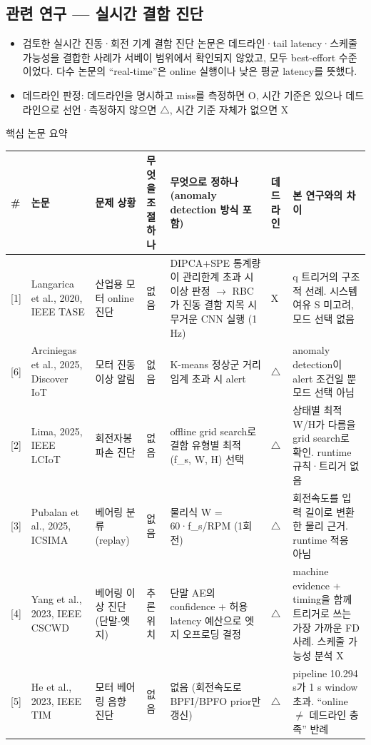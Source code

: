 \documentclass[10pt]{article}
\begin{document}
\subsection{관련 연구 --- 실시간 결함 진단}
\begin{itemize}
\item 검토한 실시간 진동·회전 기계 결함 진단 논문은 데드라인·tail latency·스케줄 가능성을 결합한 사례가 서베이 범위에서 확인되지 않았고, 모두 best-effort 수준이었다. 다수 논문의 ``real-time''은 online 실행이나 낮은 평균 latency를 뜻했다.
\item 데드라인 판정: 데드라인을 명시하고 miss를 측정하면 O, 시간 기준은 있으나 데드라인으로 선언·측정하지 않으면 $\triangle$, 시간 기준 자체가 없으면 X
\end{itemize}
\noindent 핵심 논문 요약
\begin{center}\scriptsize
\begin{tabular}{@{}C{0.6cm}L{2.5cm}L{2.4cm}L{1.7cm}L{4.5cm}C{1.0cm}L{3.0cm}@{}}
\toprule
\# & 논문 & 문제 상황 & 무엇을 조절하나 & 무엇으로 정하나 (anomaly detection 방식 포함) & 데드라인 & 본 연구와의 차이 \\ \midrule
{[1]} & Langarica et al., 2020, IEEE TASE & 산업용 모터 online 진단 & 없음 & DIPCA+SPE 통계량이 관리한계 초과 시 이상 판정 $\rightarrow$ RBC가 진동 결함 지목 시 무거운 CNN 실행 (1 Hz) & X & q 트리거의 구조적 선례. 시스템 여유 S 미고려, 모드 선택 없음 \\
{[6]} & Arciniegas et al., 2025, Discover IoT & 모터 진동 이상 알림 & 없음 & K-means 정상군 거리 임계 초과 시 alert & $\triangle$ & anomaly detection이 alert 조건일 뿐 모드 선택 아님 \\
{[2]} & Lima, 2025, IEEE LCIoT & 회전자봉 파손 진단 & 없음 & offline grid search로 결함 유형별 최적 (f\_s, W, H) 선택 & $\triangle$ & 상태별 최적 W/H가 다름을 grid search로 확인. runtime 규칙·트리거 없음 \\
{[3]} & Pubalan et al., 2025, ICSIMA & 베어링 분류 (replay) & 없음 & 물리식 W = 60·f\_s/RPM (1회전) & $\triangle$ & 회전속도를 입력 길이로 변환한 물리 근거. runtime 적응 아님 \\
{[4]} & Yang et al., 2023, IEEE CSCWD & 베어링 이상 진단 (단말-엣지) & 추론 위치 & 단말 AE의 confidence + 허용 latency 예산으로 엣지 오프로딩 결정 & $\triangle$ & machine evidence + timing을 함께 트리거로 쓰는 가장 가까운 FD 사례. 스케줄 가능성 분석 X \\
{[5]} & He et al., 2023, IEEE TIM & 모터 베어링 음향 진단 & 없음 & 없음 (회전속도로 BPFI/BPFO prior만 갱신) & $\triangle$ & pipeline 10.294 s가 1 s window 초과. ``online $\ne$ 데드라인 충족'' 반례 \\
\bottomrule
\end{tabular}
\end{center}
\end{document}
